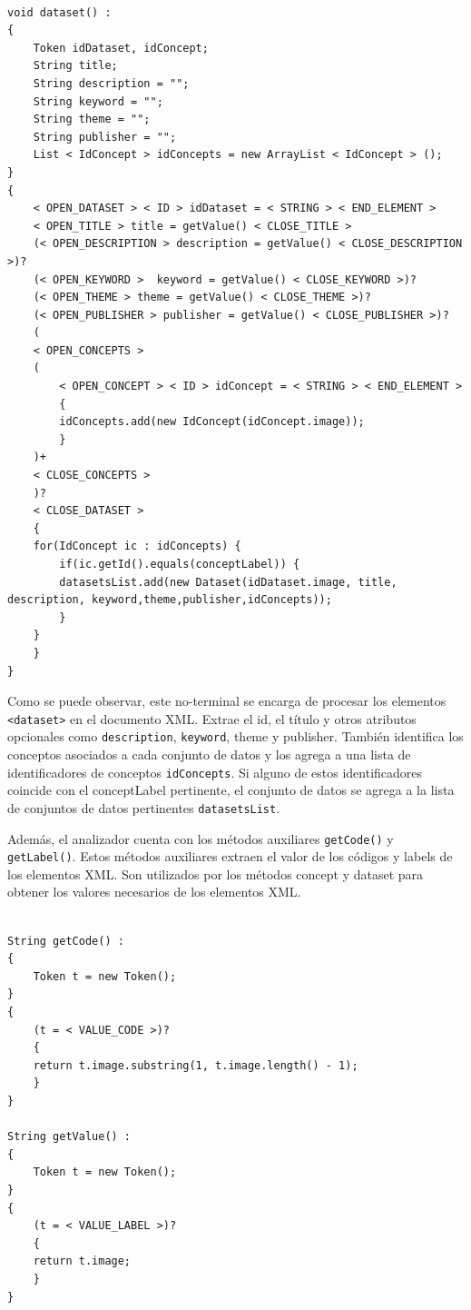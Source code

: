 \lstset{inputencoding=utf8/latin1}
\begin{lstlisting}
    
void dataset() :
{
    Token idDataset, idConcept;
    String title;
    String description = "";
    String keyword = "";
    String theme = "";
    String publisher = "";
    List < IdConcept > idConcepts = new ArrayList < IdConcept > ();
} 
{
    < OPEN_DATASET > < ID > idDataset = < STRING > < END_ELEMENT > 
    < OPEN_TITLE > title = getValue() < CLOSE_TITLE > 
    (< OPEN_DESCRIPTION > description = getValue() < CLOSE_DESCRIPTION >)?
    (< OPEN_KEYWORD >  keyword = getValue() < CLOSE_KEYWORD >)?
    (< OPEN_THEME > theme = getValue() < CLOSE_THEME >)?
    (< OPEN_PUBLISHER > publisher = getValue() < CLOSE_PUBLISHER >)?
    (
    < OPEN_CONCEPTS >
    (
        < OPEN_CONCEPT > < ID > idConcept = < STRING > < END_ELEMENT >
        {
        idConcepts.add(new IdConcept(idConcept.image));
        }
    )+
    < CLOSE_CONCEPTS >
    )?
    < CLOSE_DATASET >
    {
    for(IdConcept ic : idConcepts) {
        if(ic.getId().equals(conceptLabel)) {
        datasetsList.add(new Dataset(idDataset.image, title, description, keyword,theme,publisher,idConcepts));
        }
    }
    }
}   

\end{lstlisting}

Como se puede observar, este no-terminal se encarga de procesar los elementos \lstinline|<dataset>| en el documento XML. Extrae el id, el título y otros atributos opcionales como \lstinline|description|, \lstinline|keyword|, theme y publisher. También identifica los conceptos asociados a cada conjunto de datos y los agrega a una lista de identificadores de conceptos \lstinline|idConcepts|. Si alguno de estos identificadores coincide con el conceptLabel pertinente, el conjunto de datos se agrega a la lista de conjuntos de datos pertinentes \lstinline|datasetsList|.

Además, el analizador cuenta con los métodos auxiliares \lstinline|getCode()| y \lstinline|getLabel()|. Estos métodos auxiliares extraen el valor de los códigos y labels de los elementos XML. Son utilizados por los métodos concept y dataset para obtener los valores necesarios de los elementos XML.

\lstset{inputencoding=utf8/latin1}
\begin{lstlisting}

String getCode() :
{
    Token t = new Token();
}
{
    (t = < VALUE_CODE >)?
    {
    return t.image.substring(1, t.image.length() - 1);
    }
}

String getValue() :
{
    Token t = new Token();
}
{
    (t = < VALUE_LABEL >)?
    {
    return t.image;
    }
}  

\end{lstlisting}

